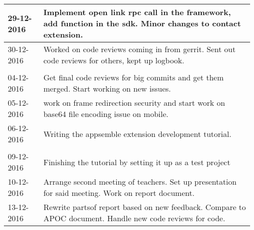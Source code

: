 \begin{tabular}{|p{2cm}|p{11cm}|}
	\hline
	29-12-2016 &  Implement open link rpc call in the framework, add function in the sdk. Minor changes to contact extension. \\ \hline
	30-12-2016 &  Worked on code reviews coming in from gerrit. Sent out code reviews for others, kept up logbook. \\ \hline
	
	\\ \hline
	
	04-12-2016 &  Get final code reviews for big commits and get them merged. Start working on new issues. \\ \hline
	05-12-2016 &  work on frame redirection security and start work on base64 file encoding issue on mobile. \\ \hline
	06-12-2016 & Writing the appsemble extension development tutorial. \\ \hline
	
	\\ \hline
	
	09-12-2016 & Finishing the tutorial by setting it up as a test project \\ \hline
	10-12-2016 & Arrange second meeting of teachers. Set up presentation for said meeting. Work on report document. \\ \hline
	13-12-2016 & Rewrite partsof report based on new feedback. Compare to APOC document. Handle new code reviews for code. \\ \hline 
\end{tabular}
